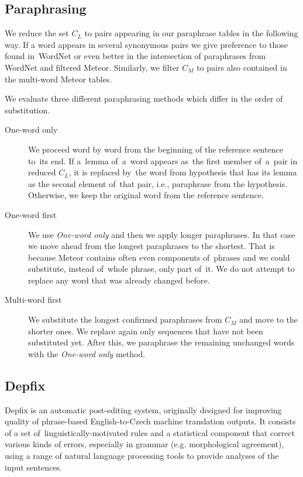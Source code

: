 \subsection{Paraphrasing}
We reduce the set $ C_{L} $ to pairs appearing in our paraphrase tables in the 
following way. If a word appears in several synonymous pairs we give preference 
to those found in~WordNet or even better in the intersection of paraphrases 
from WordNet and filtered Meteor. Similarly, we filter $ C_{M} $ to pairs also 
contained in the multi-word Meteor tables.

We evaluate three different paraphrasing methods which differ in the order of
substitution.

\begin{description}
\item[One-word only] We proceed word by word from the beginning of the 
reference sentence to~its end. If a~lemma of~a~word appears as~the first member 
of~a~pair in reduced $ C_{L} $, it is replaced by~the word from hypothesis that has 
its lemma as the second element of~that pair, i.e., paraphrase from the hypothesis. 
Otherwise, we keep the original word from the reference sentence.
\item[One-word first] We use \textit{One-word only} and then we apply longer 
paraphrases. In that case we move ahead from the longest paraphrases to the 
shortest. That is because Meteor contains often even components of~phrases 
and we could substitute, instead of~whole phrase, only part of~it. We do not 
attempt to replace any word that was already changed before.
\item[Multi-word first] We substitute the longest confirmed paraphrases from
$ C_{M} $ and move to the shorter ones. We replace again only sequences that 
have not been substituted yet. After this, we paraphrase the remaining 
unchanged words with the \textit{One-word only} method.
\end{description}

\subsection{Depfix}
\label{depfix}
Depfix is an automatic post-editing system, originally designed for improving quality
of phrase-based English-to-Czech machine translation outputs. It consists of a
set of~linguistically-motivated rules and a statistical component that correct
various kinds of errors, especially in grammar (e.g. morphological agreement),
using a range of natural language processing tools to provide analyses of the
input sentences. 

